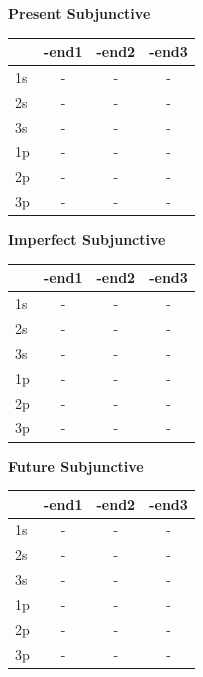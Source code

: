 \documentclass{book}
\begin{document}
\noindent
\begin{minipage}{0.32\textwidth}
\centering
\textbf{Present Subjunctive} \\ \vspace{0.1cm}
\begin{tabular}{lccc} \toprule & -end1 & -end2 & -end3 \\ \midrule 1s & - & - & - \\ 2s & - & - & - \\ 3s & - & - & - \\ 1p & - & - & - \\ 2p & - & - & - \\ 3p & - & - & - \\ \bottomrule \end{tabular}
\end{minipage}\hfill
\begin{minipage}{0.32\textwidth}
\centering
\textbf{Imperfect Subjunctive} \\ \vspace{0.1cm}
\begin{tabular}{lccc} \toprule & -end1 & -end2 & -end3 \\ \midrule 1s & - & - & - \\ 2s & - & - & - \\ 3s & - & - & - \\ 1p & - & - & - \\ 2p & - & - & - \\ 3p & - & - & - \\ \bottomrule \end{tabular}
\end{minipage}\hfill
\begin{minipage}{0.32\textwidth}
\centering
\textbf{Future Subjunctive} \\ \vspace{0.1cm}
\begin{tabular}{lccc} \toprule & -end1 & -end2 & -end3 \\ \midrule 1s & - & - & - \\ 2s & - & - & - \\ 3s & - & - & - \\ 1p & - & - & - \\ 2p & - & - & - \\ 3p & - & - & - \\ \bottomrule \end{tabular}
\end{minipage}
\end{document}
